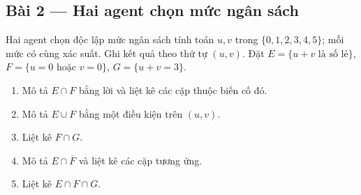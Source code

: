 \documentclass[11pt,a4paper]{article}
\begin{document}
\noindent\begin{minipage}{\linewidth}
\subsection*{Bài 2 --- Hai agent chọn mức ngân sách}

Hai agent chọn độc lập mức ngân sách tính toán \(u,v\) trong \(\{0,1,2,3,4,5\}\); mỗi mức có cùng xác suất. Ghi kết quả theo thứ tự \((u,v)\). Đặt \(E=\{u+v\text{ là số lẻ}\}\), \(F=\{u=0\text{ hoặc }v=0\}\), \(G=\{u+v=3\}\).

\begin{enumerate}[label=\alph*)]
\item Mô tả \(E\cap F\) bằng lời và liệt kê các cặp thuộc biến cố đó.
\item Mô tả \(E\cup F\) bằng một điều kiện trên \((u,v)\).
\item Liệt kê \(F\cap G\).
\item Mô tả \(E\cap\overline F\) và liệt kê các cặp tương ứng.
\item Liệt kê \(E\cap F\cap G\).
\end{enumerate}

\end{minipage}\par

\par\medskip
\end{document}
